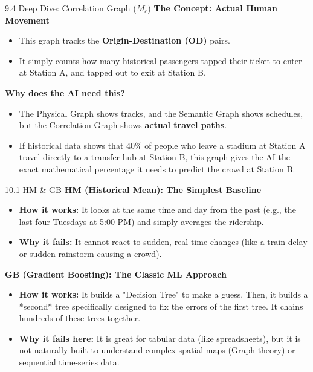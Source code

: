 \documentclass[aspectratio=169]{beamer}
\begin{document}
\begin{frame}{9.4 Deep Dive: Correlation Graph ($M_c$)}
    \textbf{The Concept: Actual Human Movement}
    \begin{itemize}
        \item This graph tracks the \textbf{Origin-Destination (OD)} pairs.
        \item It simply counts how many historical passengers tapped their ticket to enter at Station A, and tapped out to exit at Station B.
    \end{itemize}

    \vspace{0.3cm}
    \textbf{Why does the AI need this?}
    \begin{itemize}
        \item The Physical Graph shows tracks, and the Semantic Graph shows schedules, but the Correlation Graph shows \textbf{actual travel paths}.
        \item If historical data shows that 40\% of people who leave a stadium at Station A travel directly to a transfer hub at Station B, this graph gives the AI the exact mathematical percentage it needs to predict the crowd at Station B.
    \end{itemize}
\end{frame}

\begin{frame}{10.1 HM \& GB}
    \textbf{HM (Historical Mean): The Simplest Baseline}
    \begin{itemize}
        \item \textbf{How it works:} It looks at the same time and day from the past (e.g., the last four Tuesdays at 5:00 PM) and simply averages the ridership.
        \item \textbf{Why it fails:} It cannot react to sudden, real-time changes (like a train delay or sudden rainstorm causing a crowd).
    \end{itemize}

    \vspace{0.3cm}
    \textbf{GB (Gradient Boosting): The Classic ML Approach}
    \begin{itemize}
        \item \textbf{How it works:} It builds a "Decision Tree" to make a guess. Then, it builds a *second* tree specifically designed to fix the errors of the first tree. It chains hundreds of these trees together.
        \item \textbf{Why it fails here:} It is great for tabular data (like spreadsheets), but it is not naturally built to understand complex spatial maps (Graph theory) or sequential time-series data.
    \end{itemize}
\end{frame}
\end{document}
